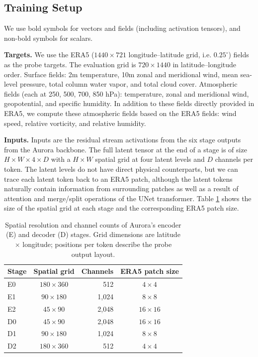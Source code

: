 \documentclass{article}
\theoremstyle{plain}
\theoremstyle{definition}
\begin{document}
\subsection{Training Setup}

We use bold symbols for vectors and fields (including activation tensors), and non-bold symbols for scalars.

\textbf{Targets.} We use the ERA5 ($1440 \times 721$ longitude--latitude grid, i.e. $0.25^\circ$) \citep{hersbach2020era5} fields as the probe targets. The evaluation grid is $720 \times 1440$ in latitude--longitude order. Surface fields: 2m temperature, 10m zonal and meridional wind, mean sea-level pressure, total column water vapor, and total cloud cover. Atmospheric fields (each at 250, 500, 700, 850 hPa): temperature, zonal and meridional wind, geopotential, and specific humidity. In addition to these fields directly provided in ERA5, we compute these atmospheric fields based on the ERA5 fields: wind speed, relative vorticity, and relative humidity.

\textbf{Inputs.} Inputs are the residual stream activations from the six stage outputs from the Aurora backbone. The full latent tensor at the end of a stage is of size $H \times W \times 4 \times D$ with a $H \times W$ spatial grid at four latent levels and $D$ channels per token. The latent levels do not have direct physical counterparts, but we can trace each latent token back to an ERA5 patch, although the latent tokens naturally contain information from surrounding patches as well as a result of attention and merge/split operations of the UNet transformer. Table \ref{tab:backbone_stages} shows the size of the spatial grid at each stage and the corresponding ERA5 patch size.

\begin{table}[t!]
  \caption{Spatial resolution and channel counts of Aurora's encoder (E) and decoder (D) stages. Grid dimensions are latitude $\times$ longitude; positions per token describe the probe output layout.}
  \label{tab:backbone_stages}
  \centering
  \small
  \setlength{\tabcolsep}{0pt}
  \begin{tabular*}{\columnwidth}{@{\extracolsep{\fill}}lcrc@{}}
    \toprule
    \textbf{Stage} & \textbf{Spatial grid} & \textbf{Channels} & \textbf{ERA5 patch size} \\
    \midrule
    E0 & $180 \times 360$ & 512 & $4 \times 4$ \\
    E1 & $90 \times 180$ & 1,024 & $8 \times 8$ \\
    E2 & $45 \times 90$ & 2,048 & $16 \times 16$ \\
    \midrule[0.3pt]
    D0 & $45 \times 90$ & 2,048 & $16 \times 16$ \\
    D1 & $90 \times 180$ & 1,024 & $8 \times 8$ \\
    D2 & $180 \times 360$ & 512 & $4 \times 4$ \\
    \bottomrule
  \end{tabular*}
\end{table}
\end{document}
